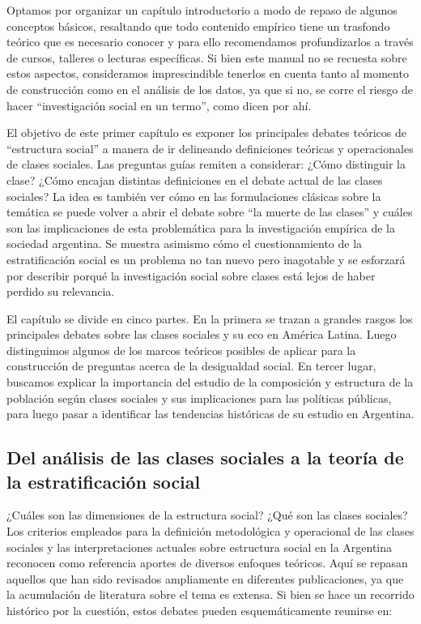 \documentclass[
]{article}
\begin{document}
Optamos por organizar un capítulo introductorio a modo de repaso de algunos conceptos básicos, resaltando que todo contenido empírico tiene un trasfondo teórico que es necesario conocer y para ello recomendamos profundizarlos a través de cursos, talleres o lecturas específicas. Si bien este manual no se recuesta sobre estos aspectos, consideramos imprescindible tenerlos en cuenta tanto al momento de construcción como en el análisis de los datos, ya que si no, se corre el riesgo de hacer ``investigación social en un termo'', como dicen por ahí.

El objetivo de este primer capítulo es exponer los principales debates teóricos de ``estructura social'' a manera de ir delineando definiciones teóricas y operacionales de clases sociales. Las preguntas guías remiten a considerar: ¿Cómo distinguir la clase? ¿Cómo encajan distintas definiciones en el debate actual de las clases sociales? La idea es también ver cómo en las formulaciones clásicas sobre la temática se puede volver a abrir el debate sobre ``la muerte de las clases'' y cuáles son las implicaciones de esta problemática para la investigación empírica de la sociedad argentina. Se muestra asimismo cómo el cuestionamiento de la estratificación social es un problema no tan nuevo pero inagotable y se esforzará por describir porqué la investigación social sobre clases está lejos de haber perdido su relevancia.

El capítulo se divide en cinco partes. En la primera se trazan a grandes rasgos los principales debates sobre las clases sociales y su eco en América Latina. Luego distinguimos algunos de los marcos teóricos posibles de aplicar para la construcción de preguntas acerca de la desigualdad social. En tercer lugar, buscamos explicar la importancia del estudio de la composición y estructura de la población según clases sociales y sus implicaciones para las políticas públicas, para luego pasar a identificar las tendencias históricas de su estudio en Argentina.

\hypertarget{analisis1}{%
\subsection{Del análisis de las clases sociales a la teoría de la estratificación social}\label{analisis1}}

¿Cuáles son las dimensiones de la estructura social? ¿Qué son las clases sociales? Los criterios empleados para la definición metodológica y operacional de las clases sociales y las interpretaciones actuales sobre estructura social en la Argentina reconocen como referencia aportes de diversos enfoques teóricos. Aquí se repasan aquellos que han sido revisados ampliamente en diferentes publicaciones, ya que la acumulación de literatura sobre el tema es extensa. Si bien se hace un recorrido histórico por la cuestión, estos debates pueden esquemáticamente reunirse en:
\end{document}
